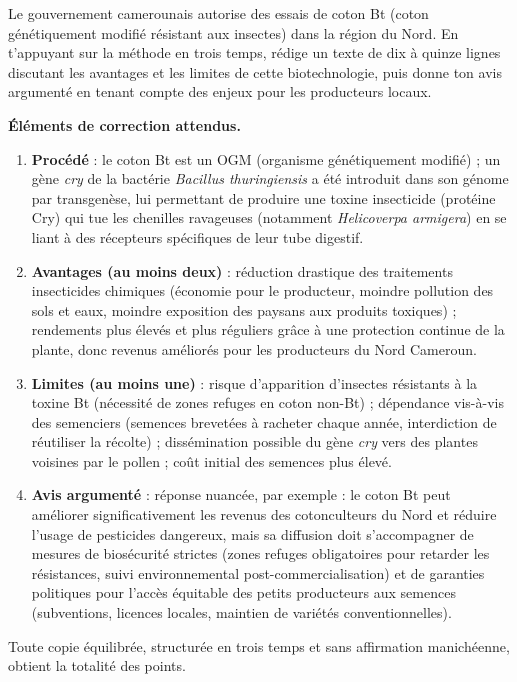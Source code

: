 \documentclass[11pt]{article}
\begin{document}
\begin{exercice}
Le gouvernement camerounais autorise des essais de coton Bt (coton génétiquement modifié résistant aux insectes) dans la région du Nord. En t'appuyant sur la méthode en trois temps, rédige un texte de dix à quinze lignes discutant les avantages et les limites de cette biotechnologie, puis donne ton avis argumenté en tenant compte des enjeux pour les producteurs locaux.
\end{exercice}

\begin{corrige}[Exercice]
\textbf{Éléments de correction attendus.}
\begin{enumerate}
\item \textbf{Procédé} : le coton Bt est un OGM (organisme génétiquement modifié) ; un gène \emph{cry} de la bactérie \emph{Bacillus thuringiensis} a été introduit dans son génome par transgenèse, lui permettant de produire une toxine insecticide (protéine Cry) qui tue les chenilles ravageuses (notamment \emph{Helicoverpa armigera}) en se liant à des récepteurs spécifiques de leur tube digestif.
\item \textbf{Avantages (au moins deux)} : réduction drastique des traitements insecticides chimiques (économie pour le producteur, moindre pollution des sols et eaux, moindre exposition des paysans aux produits toxiques) ; rendements plus élevés et plus réguliers grâce à une protection continue de la plante, donc revenus améliorés pour les producteurs du Nord Cameroun.
\item \textbf{Limites (au moins une)} : risque d'apparition d'insectes résistants à la toxine Bt (nécessité de zones refuges en coton non-Bt) ; dépendance vis-à-vis des semenciers (semences brevetées à racheter chaque année, interdiction de réutiliser la récolte) ; dissémination possible du gène \emph{cry} vers des plantes voisines par le pollen ; coût initial des semences plus élevé.
\item \textbf{Avis argumenté} : réponse nuancée, par exemple : le coton Bt peut améliorer significativement les revenus des cotonculteurs du Nord et réduire l'usage de pesticides dangereux, mais sa diffusion doit s'accompagner de mesures de biosécurité strictes (zones refuges obligatoires pour retarder les résistances, suivi environnemental post-commercialisation) et de garanties politiques pour l'accès équitable des petits producteurs aux semences (subventions, licences locales, maintien de variétés conventionnelles).
\end{enumerate}
Toute copie équilibrée, structurée en trois temps et sans affirmation manichéenne, obtient la totalité des points.
\end{corrige}
\end{document}
